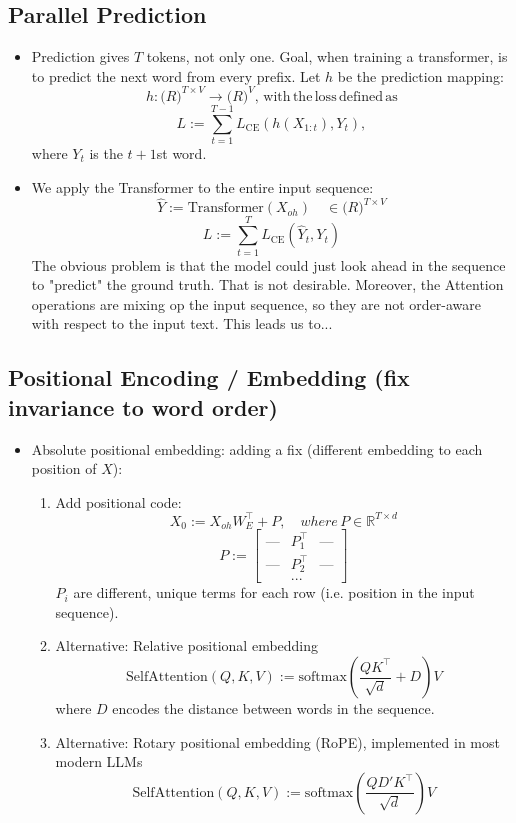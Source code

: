 \documentclass{article}
\begin{document}
\subsection*{Parallel Prediction}
\begin{itemize}
    \item Prediction gives $T$ tokens, not only one. Goal, when training a transformer, is to predict the next word from every prefix. Let $h$ be the prediction mapping:
    $$h: \mathbb(R)^{T\times V} \rightarrow \mathbb(R)^V \mathrm{,\,with\,the\,loss\,defined\,as}$$
    $$L:=\sum_{t=1}^{T-1} L_\mathrm{CE}(h(X_{1:t}),Y_t),$$
    where $Y_t$ is the $t+1$st word.

    \item We apply the Transformer to the entire input sequence:
    $$\hat{Y} := \mathrm{Transformer}(X_{oh}) \quad \in\mathbb(R)^{T\times V}$$
    $$L:=\sum_{t=1}^T L_\mathrm{CE}(\hat{Y}_t,Y_t)$$
    The obvious problem is that the model could just look ahead in the sequence to "predict" the ground truth. That is not desirable. Moreover, the Attention operations are mixing op the input sequence, so they are not order-aware with respect to the input text. This leads us to...
\end{itemize}

\subsection*{Positional Encoding / Embedding (fix invariance to word order)}
\begin{itemize}
    \item Absolute positional embedding: adding a fix (different embedding to each position of $X$):
    \begin{enumerate}
        \item Add positional code:
        $$X_0 := X_{oh}W_E^\intercal + P{,\quad where\,} P\in\mathbb{R}^{T\times d}$$
        $$P:=\begin{bmatrix}
            \text{---} & P_1^\intercal & \text{---} \\
            \text{---} & P_2^\intercal & \text{---} \\
            &...&
        \end{bmatrix}$$
        $P_i$ are different, unique terms for each row (i.e. position in the input sequence).

        \item Alternative: Relative positional embedding
        $$\mathrm{SelfAttention}(Q, K, V):=\mathrm{softmax}\left(\frac{QK^\intercal}{\sqrt{d}}+D\right)V$$
        where $D$ encodes the distance between words in the sequence.

        \item Alternative: Rotary positional embedding (RoPE), implemented in most modern LLMs
        $$\mathrm{SelfAttention}(Q, K, V):=\mathrm{softmax}\left(\frac{QD'K^\intercal}{\sqrt{d}}\right)V$$
    \end{enumerate}
\end{itemize}
\end{document}
